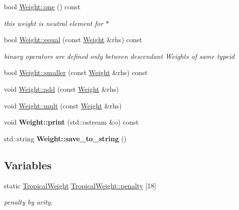 \begin{DoxyCompactItemize}
\mbox{\label{group__weight_ga0fb0a47475e245e955aa6e7926f7a0f6}} 
bool \mbox{\hyperlink{group__weight_ga0fb0a47475e245e955aa6e7926f7a0f6}{Weight\+::one}} () const
\begin{DoxyCompactList}\small\item\em this weight is neutral element for $\ast$ \end{DoxyCompactList}\item 
bool \mbox{\hyperlink{group__weight_ga11236e38c2dc7cc66a367c2ea5921c1e}{Weight\+::equal}} (const \mbox{\hyperlink{classWeight}{Weight}} \&rhs) const
\begin{DoxyCompactList}\small\item\em binary operators are defined only between descendant Weights of same typeid \end{DoxyCompactList}\item 
bool \mbox{\hyperlink{group__weight_gab3a3a5fb989514e5673582b9a7107d97}{Weight\+::smaller}} (const \mbox{\hyperlink{classWeight}{Weight}} \&rhs) const
\item 
void \mbox{\hyperlink{group__weight_ga261db18abff49cac38bd02b8f7af94db}{Weight\+::add}} (const \mbox{\hyperlink{classWeight}{Weight}} \&rhs)
\item 
void \mbox{\hyperlink{group__weight_ga7188f571e507d7f31b76de7faebdb78f}{Weight\+::mult}} (const \mbox{\hyperlink{classWeight}{Weight}} \&rhs)
\item 
\mbox{\label{group__weight_ga0f92a47af6c72b59183835d0b11a3d60}} 
void {\bfseries Weight\+::print} (std\+::ostream \&o) const
\item 
\mbox{\label{group__weight_gaeb6c4f1cf187978576df2bc31a5e5eb8}} 
std\+::string {\bfseries Weight\+::save\+\_\+to\+\_\+string} ()
\end{DoxyCompactItemize}
\subsection*{Variables}
\begin{DoxyCompactItemize}
\item 
static \mbox{\hyperlink{classTropicalWeight}{Tropical\+Weight}} \mbox{\hyperlink{group__weight_ga65ae4a5dbff3b9bf3d9972147868fc05}{Tropical\+Weight\+::penalty}} \mbox{[}18\mbox{]}
\begin{DoxyCompactList}\small\item\em penalty by arity. \end{DoxyCompactList}\end{DoxyCompactItemize}


